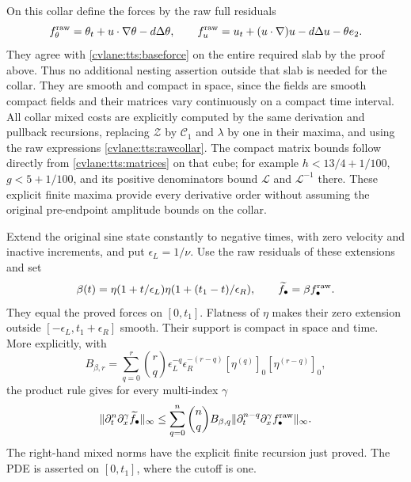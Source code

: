 On this collar define the forces by the raw full residuals
\begin{equation}\label{cvlane:tts:rawcollar}
 f_\theta^{\rm raw}=\theta_t+u\cdot\nabla\theta-d\Delta\theta,
 \qquad
 f_u^{\rm raw}=u_t+(u\cdot\nabla)u-d\Delta u-\theta e_2.
\end{equation}
They agree with \eqref{cvlane:tts:baseforce} on the entire required
slab by the proof above. Thus no additional nesting assertion
outside that slab is needed for the collar. They are smooth and
compact in space, since the fields are smooth compact fields and
their matrices vary continuously on a compact time interval.
All collar mixed costs are explicitly computed by the same
derivation and pullback recursions, replacing $\mathcal Z$ by
$\mathcal C_1$ and $\lambda$ by one in their maxima, and using
the raw expressions \eqref{cvlane:tts:rawcollar}. The compact matrix
bounds follow directly from \eqref{cvlane:tts:matrices} on that cube;
for example $h<13/4+1/100$, $g<5+1/100$, and its positive
denominators bound $\mathcal L$ and $\mathcal L^{-1}$ there.
These explicit finite maxima provide every derivative order without
assuming the original pre-endpoint amplitude bounds on the collar.

Extend the original sine state constantly to negative times, with
zero velocity and inactive increments, and put $\epsilon_L=1/\nu$.
Use the raw residuals of these extensions and set
\begin{equation}\label{cvlane:tts:timecutoff}
 \beta(t)=\eta(1+t/\epsilon_L)
                   \eta(1+(t_1-t)/\epsilon_R),\qquad
 \widetilde f_\bullet=\beta f_\bullet^{\rm raw}.
\end{equation}
They equal the proved forces on $[0,t_1]$. Flatness of $\eta$
makes their zero extension outside
$[-\epsilon_L,t_1+\epsilon_R]$ smooth. Their support is compact
in space and time. More explicitly, with
\[
 B_{\beta,r}=\sum_{q=0}^r\binom rq
 \epsilon_L^{-q}\epsilon_R^{-(r-q)}
              [\eta^{(q)}]_0[\eta^{(r-q)}]_0,
\]
the product rule gives for every multi-index $\gamma$
\begin{equation}\label{cvlane:tts:cutoffcost}
 \|\partial_t^n\partial_x^\gamma\widetilde f_\bullet\|_\infty
 \leq\sum_{q=0}^n\binom nq B_{\beta,q}
       \|\partial_t^{n-q}\partial_x^\gamma
                              f_\bullet^{\rm raw}\|_\infty.
\end{equation}
The right-hand mixed norms have the explicit finite recursion just
proved. The PDE is asserted on $[0,t_1]$, where the cutoff is one.

